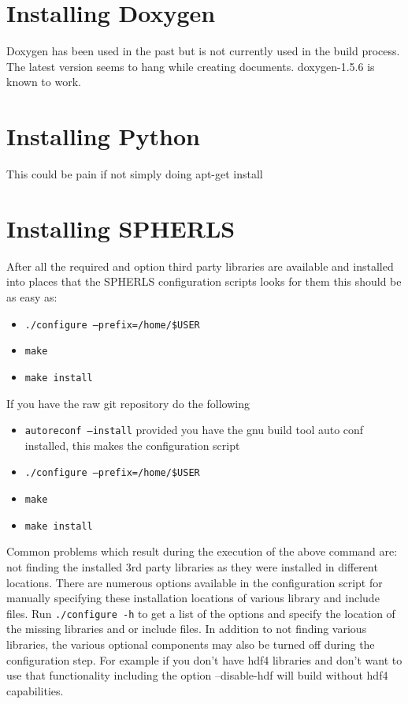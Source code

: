 \documentclass[12pt,a4paper]{book}
\begin{document}
\section{Installing Doxygen}
Doxygen has been used in the past but is not currently used in the build process. The latest version seems to hang while creating documents. doxygen-1.5.6 is known to work.

\section{Installing Python}
This could be pain if not simply doing apt-get install

\section{Installing SPHERLS}
After all the required and option third party libraries are available and installed into places that the SPHERLS configuration scripts looks for them this should be as easy as:
\begin{itemize}
\item {\tt ./configure --prefix=/home/\${USER}}
\item {\tt make}
\item {\tt make install}
\end{itemize}
If you have the raw git repository do the following
\begin{itemize}
\item {\tt autoreconf --install} provided you have the gnu build tool auto conf installed, this makes the configuration script
\item {\tt ./configure --prefix=/home/\${USER}}
\item {\tt make}
\item {\tt make install}
\end{itemize}
Common problems which result during the execution of the above command are: not finding the installed 3rd party libraries as they were installed in different locations. There are numerous options available in the configuration script for manually specifying these installation locations of various library and include files. Run {\tt ./configure -h} to get a list of the options and specify the location of the missing libraries and or include files. In addition to not finding various libraries, the various optional components may also be turned off during the configuration step. For example if you don't have hdf4 libraries and don't want to use that functionality including the option --disable-hdf will build without hdf4 capabilities.
\end{document}
